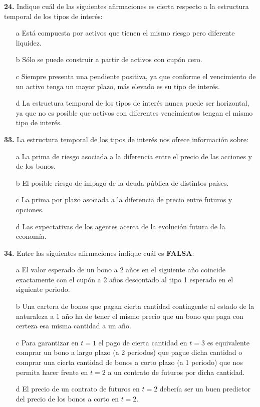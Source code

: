 \documentclass{nuevotema}
\begin{document}
\textbf{24.} Indique cuál de las siguientes afirmaciones es cierta respecto a la estructura temporal de los tipos de interés:
\begin{enumerate}
	\item[a] Está compuesta por activos que tienen el mismo riesgo pero diferente liquidez.
	\item[b] Sólo se puede construir a partir de activos con cupón cero.
	\item[c] Siempre presenta una pendiente positiva, ya que conforme el vencimiento de un activo tenga un mayor plazo, más elevado es su tipo de interés.
	\item[d] La estructura temporal de los tipos de interés nunca puede ser horizontal, ya que no es posible que activos con diferentes vencimientos tengan el mismo tipo de interés.
\end{enumerate}

\textbf{33.} La estructura temporal de los tipos de interés nos ofrece información sobre:
\begin{enumerate}
	\item[a] La prima de riesgo asociada a la diferencia entre el precio de las acciones y de los bonos.
	\item[b] El posible riesgo de impago de la deuda pública de distintos países.
	\item[c] La prima por plazo asociada a la diferencia de precio entre futuros y opciones.
	\item[d] Las expectativas de los agentes acerca de la evolución futura de la economía.
\end{enumerate}

\textbf{34.} Entre las siguientes afirmaciones indique cuál es \textbf{FALSA}:
\begin{enumerate}
	\item[a] El valor esperado de un bono a 2 años en el siguiente año coincide exactamente con el cupón a 2 años descontado al tipo 1 esperado en el siguiente periodo.
	\item[b] Una cartera de bonos que pagan cierta cantidad contingente al estado de la naturaleza a 1 año ha de tener el mismo precio que un bono que paga con certeza esa misma cantidad a un año.
	\item[c] Para garantizar en $t=1$ el pago de cierta cantidad en $t=3$ es equivalente comprar un bono a largo plazo (a 2 periodos) que pague dicha cantidad o comprar una cierta cantidad de bonos a corto plazo (a 1 periodo) que nos permita hacer frente en $t=2$ a un contrato de futuros por dicha cantidad.
	\item[d] El precio de un contrato de futuros en $t=2$ debería ser un buen predictor del precio de los bonos a corto en $t=2$.
\end{enumerate}
\end{document}
